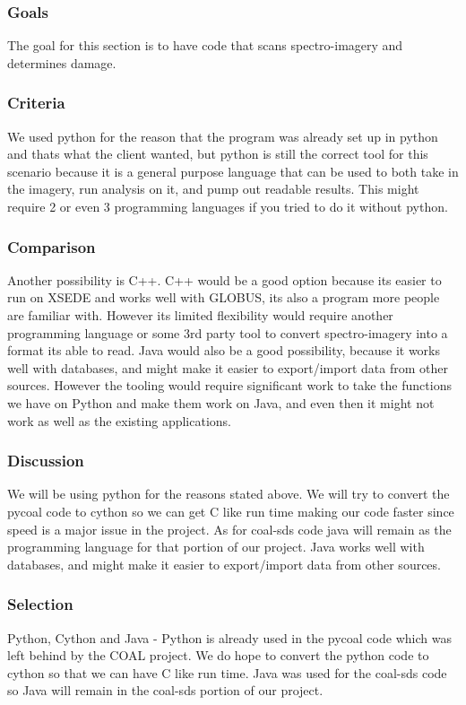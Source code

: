 \documentclass[10pt,draftclsnofoot,onecolumn,journal,compsoc]{IEEEtran}
\begin{document}
\subsubsection{Goals}
\noindent The goal for this section is to have code that scans spectro-imagery and determines damage.

\subsubsection{Criteria}
\noindent We used python
for the reason that the program was already set up in python and thats what the client wanted, but python is
still the correct tool for this scenario because it is a general purpose language that can be used to both take in
the imagery, run analysis on it, and pump out readable results. This might require 2 or even 3 programming
languages if you tried to do it without python.

\subsubsection{Comparison}
\noindent Another possibility is C++. C++ would be a good option because its easier to run on XSEDE and works well
with GLOBUS, its also a program more people are familiar with. However its limited flexibility would require
another programming language or some 3rd party tool to convert spectro-imagery into a format its able to read.\cite{5}
Java would also be a good possibility, because it works well with databases, and might make it easier to
export/import data from other sources. However the tooling would require significant work to take the functions
we have on Python and make them work on Java, and even then it might not work as well as the existing applications.

\subsubsection{Discussion}
\noindent We will be using python for the reasons stated above. We will try to convert the pycoal code to cython so we can get C like run time making our code faster since speed is a major issue in the project. As for coal-sds code java will remain as the programming language for that portion of our project. Java works well with databases, and might make it easier to export/import data from other sources.

\subsubsection{Selection}
\noindent Python, Cython and Java - Python is already used in the pycoal code which was left behind by the COAL project. We do hope to convert the python code to cython so that we can have C like run time. Java was used for the coal-sds code so Java will remain in the coal-sds portion of our project.
\end{document}
